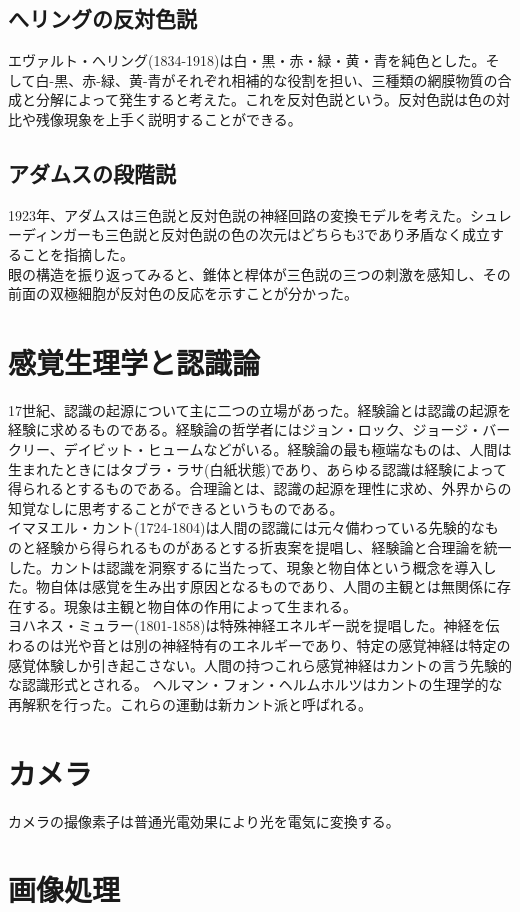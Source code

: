		\subsection{へリングの反対色説}
			エヴァルト・へリング(1834-1918)は白・黒・赤・緑・黄・青を純色とした。そして白-黒、赤-緑、黄-青がそれぞれ相補的な役割を担い、三種類の網膜物質の合成と分解によって発生すると考えた。これを反対色説という。反対色説は色の対比や残像現象を上手く説明することができる。
		\subsection{アダムスの段階説}
			1923年、アダムスは三色説と反対色説の神経回路の変換モデルを考えた。シュレーディンガーも三色説と反対色説の色の次元はどちらも3であり矛盾なく成立することを指摘した。\\
			眼の構造を振り返ってみると、錐体と桿体が三色説の三つの刺激を感知し、その前面の双極細胞が反対色の反応を示すことが分かった。
	\section{感覚生理学と認識論}
		17世紀、認識の起源について主に二つの立場があった。経験論とは認識の起源を経験に求めるものである。経験論の哲学者にはジョン・ロック、ジョージ・バークリー、デイビット・ヒュームなどがいる。経験論の最も極端なものは、人間は生まれたときにはタブラ・ラサ(白紙状態)であり、あらゆる認識は経験によって得られるとするものである。合理論とは、認識の起源を理性に求め、外界からの知覚なしに思考することができるというものである。\\
		イマヌエル・カント(1724-1804)は人間の認識には元々備わっている先験的なものと経験から得られるものがあるとする折衷案を提唱し、経験論と合理論を統一した。カントは認識を洞察するに当たって、現象と物自体という概念を導入した。物自体は感覚を生み出す原因となるものであり、人間の主観とは無関係に存在する。現象は主観と物自体の作用によって生まれる。\\
		ヨハネス・ミュラー(1801-1858)は特殊神経エネルギー説を提唱した。神経を伝わるのは光や音とは別の神経特有のエネルギーであり、特定の感覚神経は特定の感覚体験しか引き起こさない。人間の持つこれら感覚神経はカントの言う先験的な認識形式とされる。
		ヘルマン・フォン・ヘルムホルツはカントの生理学的な再解釈を行った。これらの運動は新カント派と呼ばれる。
	\section{カメラ}
		カメラの撮像素子は普通光電効果により光を電気に変換する。
	\section{画像処理}